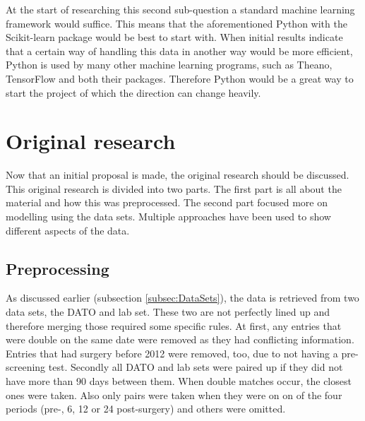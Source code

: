 \documentclass[10pt,a4paper]{article}
\begin{document}
	At the start of researching this second sub-question a standard machine learning framework would suffice. This means that the aforementioned Python with the Scikit-learn package would be best to start with. When initial results indicate that a certain way of handling this data in another way would be more efficient, Python is used by many other machine learning programs, such as Theano, TensorFlow and both their packages. Therefore Python would be a great way to start the project of which the direction can change heavily.
	
	\section{Original research}
	
	Now that an initial proposal is made, the original research should be discussed. This original research is divided into two parts. The first part is all about the material and how this was preprocessed. The second part focused more on modelling using the data sets. Multiple approaches have been used to show different aspects of the data.
	
	\subsection{Preprocessing}
	\label{subsec:Preprocessing}
	
	As discussed earlier (subsection \ref{subsec:DataSets}), the data is retrieved from two data sets, the DATO and lab set. These two are not perfectly lined up and therefore merging those required some specific rules. At first, any entries that were double on the same date were removed as they had conflicting information. Entries that had surgery before 2012 were removed, too, due to not having a pre-screening test. Secondly all DATO and lab sets were paired up if they did not have more than 90 days between them. When double matches occur, the closest ones were taken. Also only pairs were taken when they were on on of the four periods (pre-, 6, 12 or 24 post-surgery) and others were omitted.
	
\end{document}
